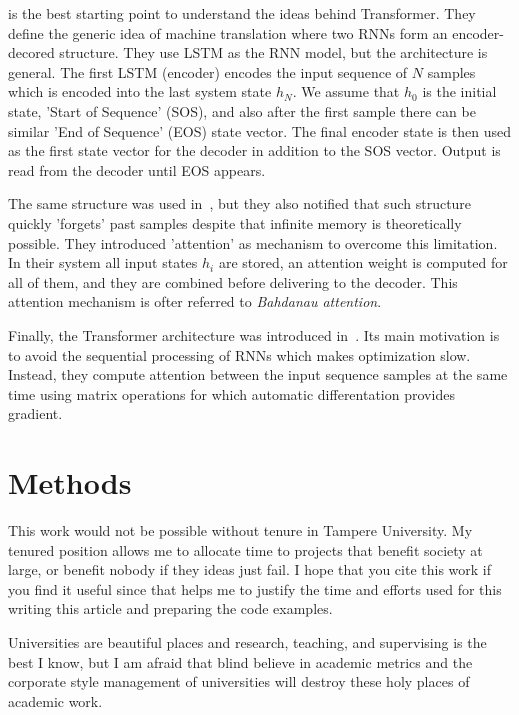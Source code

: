 \documentclass[final]{article}
\begin{document}
\citet{Sutskever-2014-neurips} is the best starting point to
understand the ideas behind Transformer. They define the generic idea
of machine translation where two RNNs form an encoder-decored
structure. They use LSTM as the RNN model, but the architecture is
general. The first LSTM (encoder) encodes the input sequence of $N$
samples which is encoded into the last system state $h_{N}$. We assume
that $h_0$ is the initial state, 'Start of Sequence' (SOS), and also after
the first sample there can be similar 'End of Sequence' (EOS) state
vector. The final encoder state is then used as the first state vector
for the decoder in addition to the SOS vector. Output is read from the
decoder until EOS appears.

The same structure was used in~\cite{Cho-2014-emnlp}, but they also
notified that such structure quickly 'forgets' past samples despite
that infinite memory is theoretically possible. They introduced
'attention' as mechanism to overcome this limitation. In their system
all input states $h_i$ are stored, an attention weight is computed for
all of them, and they are combined before delivering to the
decoder. This attention mechanism is ofter referred to
\textit{Bahdanau attention}.

Finally, the Transformer architecture was introduced
in~\cite{transformer}. Its main motivation is to avoid the sequential
processing of RNNs which makes optimization slow. Instead, they
compute attention between the input sequence samples at the same time
using matrix operations for which automatic differentation provides
gradient.

\section{Methods}


\begin{ack}
This work would not be possible without tenure in Tampere
University. My tenured position allows me to allocate time to projects
that benefit society at large, or benefit nobody if they ideas just
fail. I hope that you cite this work if you find it useful since that
helps me to justify the time and efforts used for this writing this
article and preparing the code examples.

Universities are beautiful
places and research, teaching, and supervising is the best I know, but
I am afraid that blind believe in academic metrics and the corporate
style management of universities will destroy these holy places of
academic work.
\end{ack}

\printbibliography
\end{document}
